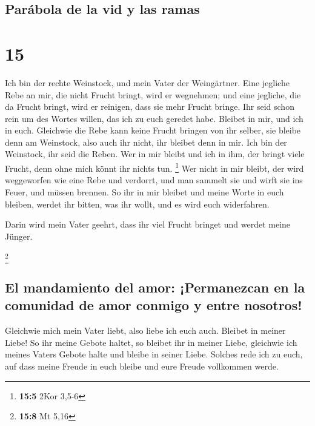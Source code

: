 \hypertarget{paruxe1bola-de-la-vid-y-las-ramas}{%
\subsection{Parábola de la vid y las
ramas}\label{paruxe1bola-de-la-vid-y-las-ramas}}

\hypertarget{section-14}{%
\section{15}\label{section-14}}

 Ich bin der rechte Weinstock, und mein Vater der
Weingärtner.  Eine jegliche Rebe an mir, die nicht Frucht
bringt, wird er wegnehmen; und eine jegliche, die da Frucht bringt, wird
er reinigen, dass sie mehr Frucht bringe.  Ihr seid schon
rein um des Wortes willen, das ich zu euch geredet habe. 
Bleibet in mir, und ich in euch. Gleichwie die Rebe kann keine Frucht
bringen von ihr selber, sie bleibe denn am Weinstock, also auch ihr
nicht, ihr bleibet denn in mir.  Ich bin der Weinstock,
ihr seid die Reben. Wer in mir bleibt und ich in ihm, der bringt viele
Frucht, denn ohne mich könnt ihr nichts tun. \footnote{\textbf{15:5}
  2Kor 3,5-6}  Wer nicht in mir bleibt, der wird
weggeworfen wie eine Rebe und verdorrt, und man sammelt sie und wirft
sie ins Feuer, und müssen brennen.  So ihr in mir bleibet
und meine Worte in euch bleiben, werdet ihr bitten, was ihr wollt, und
es wird euch widerfahren.

 Darin wird mein Vater geehrt, dass ihr viel Frucht
bringet und werdet meine Jünger.

\footnote{\textbf{15:8} Mt 5,16}

\hypertarget{el-mandamiento-del-amor-permanezcan-en-la-comunidad-de-amor-conmigo-y-entre-nosotros}{%
\subsection{El mandamiento del amor: ¡Permanezcan en la comunidad de
amor conmigo y entre
nosotros!}\label{el-mandamiento-del-amor-permanezcan-en-la-comunidad-de-amor-conmigo-y-entre-nosotros}}

 Gleichwie mich mein Vater liebt, also liebe ich euch
auch. Bleibet in meiner Liebe!  So ihr meine Gebote
haltet, so bleibet ihr in meiner Liebe, gleichwie ich meines Vaters
Gebote halte und bleibe in seiner Liebe.  Solches rede
ich zu euch, auf dass meine Freude in euch bleibe und eure Freude
vollkommen werde.

